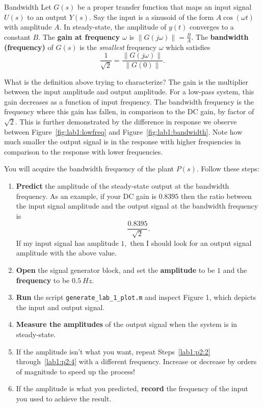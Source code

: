 %
\begin{definition}[]{Bandwidth}
  Let \(G(s)\) be a proper transfer function
  that maps an input signal \(U(s)\) to an output \(Y(s).\)
%
  Say the input is a sinusoid of the form \(A \cos(\omega t)\) with amplitude
  \(A.\) In steady-state, the amplitude of \(y(t)\) converges to a constant
  \(B.\) The \textbf{gain at frequency \(\omega\)} is
  \(\left\|G(j\omega)\right\| = \frac{B}{A}.\)
%
  The \textbf{bandwidth (frequency)} of \(G(s)\) is the \emph{smallest}
  frequency \(\omega\) which satisfies
  \[
    \frac{1}{\sqrt{2}} = \frac{\left\|G(j\omega)\right\|}{\left\|G(0)\right\|}.
  \]
\end{definition}
%
What is the definition above trying to characterize? The
gain is the multiplier between the input amplitude and output amplitude. For
a low-pass system, this gain decreases as a function of input frequency. The
bandwidth frequency is the frequency where this gain has fallen, in comparison
to the DC gain, by factor of \(\sqrt{2}.\) This is further demonstrated
by the difference in response we observe between Figure~\ref{fig:lab1:lowfreq}
and Figure~\ref{fig:lab1:bandwidth}. Note how much smaller the output signal
is in the response with higher frequencies in comparison to the response
with lower frequencies.
%
\begin{procedure}[label={proc:lab1:p2}]
  You will acquire the bandwidth frequency of the plant \(P(s)\).
  Follow these steps:
  \begin{enumerate}[label=(\arabic*)]
    \item{
      \textbf{Predict} the amplitude of the steady-state output at the
      bandwidth frequency. As an example, if your DC gain is \(0.8395\) then
      the ratio between the input signal amplitude and the output signal
      at the bandwidth frequency is
      \[
        \frac{0.8395}{\sqrt{2}}.
      \]
      If my input signal has amplitude \(1,\) then I should look for
      an output signal amplitude with the above value.
    }
    \item{
      \textbf{Open} the signal generator block, and set the
      \textbf{amplitude} to be \(1\) and
      the \textbf{frequency} to be \(\SI{0.5}{Hz}.\)
      \label{lab1:p2:2}
    }
    \item{
      \textbf{Run} the script \texttt{generate\_lab\_1\_plot.m} and inspect
      Figure 1, which depicts the input and output signal.
    }
    \item{
      \textbf{Measure the amplitudes} of the output signal
      when the system is in steady-state.
      \label{lab1:p2:4}
    }
    \item{
      If the amplitude isn't what you want, repeat Steps~\ref{lab1:p2:2} through~\ref{lab1:p2:4} with a different frequency. Increase or decrease
      by orders of magnitude to speed up the process!
    }
    \item{
      If the amplitude is what you predicted, \textbf{record} the frequency
      of the input you used to achieve the result.
    }
  \end{enumerate}
\end{procedure}
